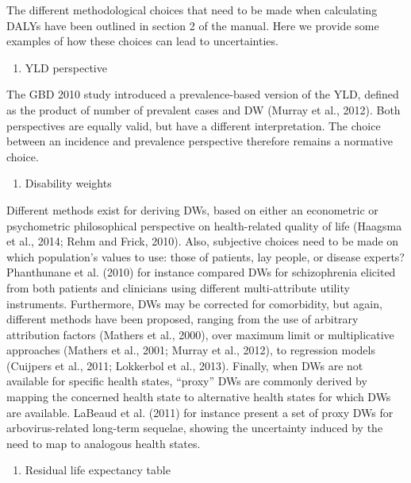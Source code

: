 \documentclass[]{book}
\providecommand{\tightlist}{%
  \setlength{\itemsep}{0pt}\setlength{\parskip}{0pt}}
\begin{document}
The different methodological choices that need to be made when
calculating DALYs have been outlined in section 2 of the manual. Here we
provide some examples of how these choices can lead to uncertainties.

\begin{enumerate}
\def\labelenumi{(\arabic{enumi})}
\tightlist
\item
  YLD perspective
\end{enumerate}

The GBD 2010 study introduced a prevalence-based version of the YLD,
defined as the product of number of prevalent cases and DW (Murray et
al., 2012). Both perspectives are equally valid, but have a different
interpretation. The choice between an incidence and prevalence
perspective therefore remains a normative choice.

\begin{enumerate}
\def\labelenumi{(\arabic{enumi})}
\setcounter{enumi}{1}
\tightlist
\item
  Disability weights
\end{enumerate}

Different methods exist for deriving DWs, based on either an econometric
or psychometric philosophical perspective on health-related quality of
life (Haagsma et al., 2014; Rehm and Frick, 2010). Also, subjective
choices need to be made on which population's values to use: those of
patients, lay people, or disease experts? Phanthunane et al. (2010) for
instance compared DWs for schizophrenia elicited from both patients and
clinicians using different multi-attribute utility instruments.
Furthermore, DWs may be corrected for comorbidity, but again, different
methods have been proposed, ranging from the use of arbitrary
attribution factors (Mathers et al., 2000), over maximum limit or
multiplicative approaches (Mathers et al., 2001; Murray et al., 2012),
to regression models (Cuijpers et al., 2011; Lokkerbol et al., 2013).
Finally, when DWs are not available for specific health states,
``proxy'' DWs are commonly derived by mapping the concerned health state
to alternative health states for which DWs are available. LaBeaud et al.
(2011) for instance present a set of proxy DWs for arbovirus-related
long-term sequelae, showing the uncertainty induced by the need to map
to analogous health states.

\begin{enumerate}
\def\labelenumi{(\arabic{enumi})}
\setcounter{enumi}{2}
\tightlist
\item
  Residual life expectancy table
\end{enumerate}
\end{document}
